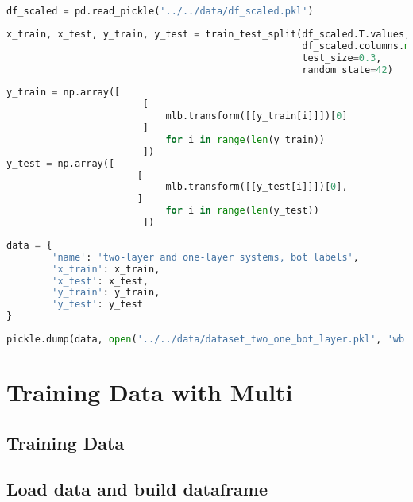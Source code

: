 \begin{lstlisting}[language=Python]
df_scaled = pd.read_pickle('../../data/df_scaled.pkl')
\end{lstlisting}

\begin{lstlisting}[language=Python]
x_train, x_test, y_train, y_test = train_test_split(df_scaled.T.values,
                                                    df_scaled.columns.map(lambda x: x.split('_')[1]), # second part of the filename is the bot label
                                                    test_size=0.3,
                                                    random_state=42)
\end{lstlisting}

\begin{lstlisting}[language=Python]
y_train = np.array([    
                        [
                            mlb.transform([[y_train[i]]])[0]
                        ] 
                            for i in range(len(y_train))
                        ])
y_test = np.array([ 
                       [
                            mlb.transform([[y_test[i]]])[0],
                       ] 
                            for i in range(len(y_test))
                        ])
\end{lstlisting}

\begin{lstlisting}[language=Python]
data = {
        'name': 'two-layer and one-layer systems, bot labels',
        'x_train': x_train,
        'x_test': x_test,
        'y_train': y_train,
        'y_test': y_test
}
\end{lstlisting}

\begin{lstlisting}[language=Python]
pickle.dump(data, open('../../data/dataset_two_one_bot_layer.pkl', 'wb'))
\end{lstlisting}

\hypertarget{training-data-with-multi}{%
\section{Training Data with Multi}\label{training-data-with-multi}}

\hypertarget{training-data}{%
\subsection{Training Data}\label{training-data}}

\hypertarget{load-data-and-build-dataframe-1}{%
\subsection{Load data and build
dataframe}\label{load-data-and-build-dataframe-1}}

